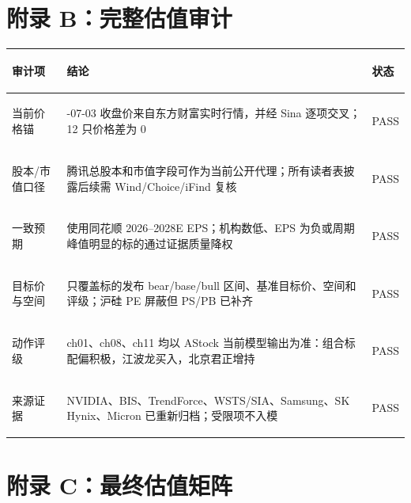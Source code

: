 \section{附录 B：完整估值审计}

\begin{exhibitbox}
\centering
\scriptsize
\renewcommand{\arraystretch}{1.24}
\begin{tabularx}{\exhibitboxwidth}{>{\bfseries\raggedright\arraybackslash}p{2.3cm} >{\raggedright\arraybackslash}X >{\centering\arraybackslash}p{1.5cm}}
\toprule
\textbf{审计项} & \textbf{结论} & \textbf{状态} \\
\midrule
当前价格锚 & 2026-07-03 收盘价来自东方财富实时行情，并经 Sina 逐项交叉；12 只价格差为 0 & PASS \\
股本/市值口径 & 腾讯总股本和市值字段可作为当前公开代理；所有读者表披露后续需 Wind/Choice/iFind 复核 & PASS \\
一致预期 & 使用同花顺 2026--2028E EPS；机构数低、EPS 为负或周期峰值明显的标的通过证据质量降权 & PASS \\
目标价与空间 & 11 只覆盖标的发布 bear/base/bull 区间、基准目标价、空间和评级；沪硅 PE 屏蔽但 PS/PB 已补齐 & PASS \\
动作评级 & ch01、ch08、ch11 均以 AStock 当前模型输出为准：组合标配偏积极，江波龙买入，北京君正增持 & PASS \\
来源证据 & NVIDIA、BIS、TrendForce、WSTS/SIA、Samsung、SK Hynix、Micron 已重新归档；受限项不入模 & PASS \\
\bottomrule
\end{tabularx}
\end{exhibitbox}

\section{附录 C：最终估值矩阵}

